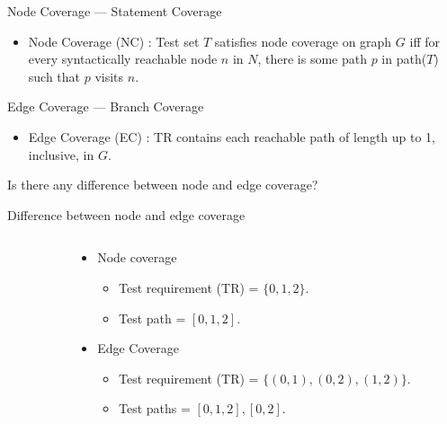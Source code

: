 \documentclass[handout]{beamer}
\begin{document}
\begin{frame}{Node Coverage --- Statement Coverage} 
  \begin{itemize}
  \item Node Coverage (NC) : Test set $T$ satisfies node coverage on
    graph $G$ iff for every syntactically reachable node $n$ in $N$, there
    is some path $p$ in path($T$) such that $p$ visits $n$.
  \end{itemize}
\end{frame}
\begin{frame}{Edge Coverage --- Branch Coverage}
  \begin{itemize}
  \item Edge Coverage (EC) : TR contains each reachable path of length
    up to 1, inclusive, in $G$.
  \end{itemize}
Is there any difference between node and edge coverage?
\end{frame}
\begin{frame}{Difference between node and edge coverage}
 \begin{columns}
   \begin{column}{0.5\textwidth}
   \end{column}
   \begin{column}{0.5\textwidth}
     \begin{itemize}
     \item Node coverage
       \begin{itemize}
       \item Test requirement (TR) = $\{0,1,2\}$.
       \item Test path = $[0,1,2]$.
       \end{itemize}
     \item Edge Coverage
       \begin{itemize}
       \item Test requirement (TR) = $\{(0,1),(0,2),(1,2)\}$.
       \item Test paths = $[0,1,2],[0,2]$.
       \end{itemize}
     \end{itemize}
   \end{column}
 \end{columns}
\end{frame}
\end{document}
